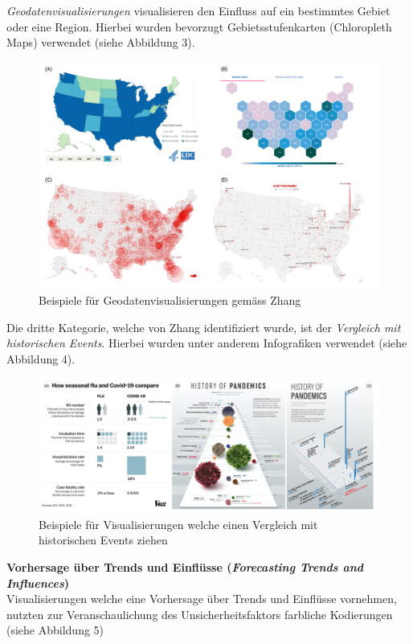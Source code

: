 \documentclass[12pt, oneside]{article}
\begin{document}
\clearpage
\textit{Geodatenvisualisierungen} visualisieren den Einfluss auf ein bestimmtes Gebiet oder eine Region. Hierbei wurden bevorzugt Gebietsstufenkarten (Chloropleth Maps) verwendet (siehe Abbildung 3).

\begin{figure}[ht]
	\includegraphics[width=12cm]{images/geospatial_visualizations.png}
	\centering
	\caption{Beispiele für Geodatenvisualisierungen gemäss Zhang ~\citep[S. 8]{YixuanZhang.}}
\end{figure}

Die dritte Kategorie, welche von Zhang identifiziert wurde, ist der \textit{Vergleich mit historischen Events}. Hierbei wurden unter anderem Infografiken verwendet (siehe Abbildung 4).


\begin{figure}[ht]
	\includegraphics[width=12cm]{images/historic_events_visualizations.png}
	\centering
	\caption{Beispiele für Visualisierungen welche einen Vergleich mit historischen Events ziehen ~\citep[S. 8]{YixuanZhang.}}
\end{figure}

\clearpage
\textbf{Vorhersage über Trends und Einflüsse (\textit{Forecasting Trends and Influences})}\\
Visualisierungen welche eine Vorhersage über Trends und Einflüsse vornehmen, nutzten zur Veranschaulichung des Unsicherheitsfaktors farbliche Kodierungen (siehe Abbildung 5)
\end{document}
